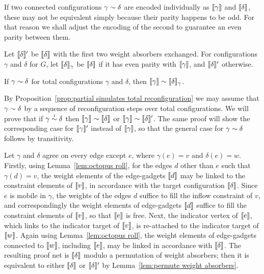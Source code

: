 \documentclass[conference]{IEEEtran}
\begin{document}
If two connected configurations $\gamma\perm\delta$ are encoded individually as $\llbracket\gamma\rrbracket$ and $\llbracket\delta\rrbracket$, these may not be equivalent simply because their parity happens to be odd.
%
For that reason we shall adjust the encoding of the second to guarantee an even parity between them.

\begin{definition}
%
Let $\llbracket\delta\rrbracket'$ be $\llbracket\delta\rrbracket$ with the first two weight absorbers exchanged.
%
For configurations $\gamma$ and $\delta$ for $G$, let $\llbracket\delta\rrbracket_\gamma$ be $\llbracket\delta\rrbracket$ if it has even parity with $\llbracket\gamma\rrbracket$, and $\llbracket\delta\rrbracket'$ otherwise.
%
\end{definition}



\begin{lemma}
\label{lem:completeness}
If $\gamma\perm\delta$ for total configurations $\gamma$ and $\delta$, then $\itn\gamma\perm\itn\delta_\gamma$.
\end{lemma}

\begin{IEEEproof}
By Proposition~\ref{prop:partial simulates total reconfiguration} we may assume that $\gamma\perm\delta$ by a sequence of reconfiguration steps over total configurations.
%
We will prove that if $\gamma\perm*\delta$ then $\itn\gamma\perm\itn\delta$ or $\itn\gamma\perm\itn\delta'$.
%
The same proof will show the corresponding case for $\llbracket\gamma\rrbracket'$ instead of $\llbracket\gamma\rrbracket$, so that the general case for $\gamma\perm\delta$ follows by transitivity.



Let $\gamma$ and $\delta$ agree on every edge except $e$, where $\gamma(e)=v$ and $\delta(e)=w$.
%
Firstly, using Lemma~\ref{lem:octopus roll}, for the edges $d$ other than $e$ such that $\gamma(d)=v$, the weight elements of the edge-gadgets $\llbracket d\rrbracket$ may be linked to the constraint elements of $\llbracket v\rrbracket$, in accordance with the target configuration $\llbracket\delta\rrbracket$.
%
Since $e$ is mobile in $\gamma$, the weights of the edges $d$ suffice to fill the inflow constraint of $v$, and correspondingly the weight elements of edge-gadgets $\llbracket d\rrbracket$ suffice to fill the constraint elements of $\llbracket v\rrbracket$, so that $\llbracket e\rrbracket$ is free.
%
Next, the indicator vertex of $\llbracket e\rrbracket$, which links to the indicator target of $\llbracket v\rrbracket$, is re-attached to the indicator target of $\llbracket w\rrbracket$.
%
Again using Lemma~\ref{lem:octopus roll}, the weight elements of edge-gadgets connected to $\llbracket w\rrbracket$, including $\llbracket e\rrbracket$, may be linked in accordance with $\llbracket\delta\rrbracket$.
%
The resulting proof net is $\llbracket\delta\rrbracket$ modulo a permutation of weight absorbers; then it is equivalent to either $\llbracket\delta\rrbracket$ or $\llbracket\delta\rrbracket'$ by Lemma~\ref{lem:permute weight absorbers}.
\end{IEEEproof}
\end{document}
